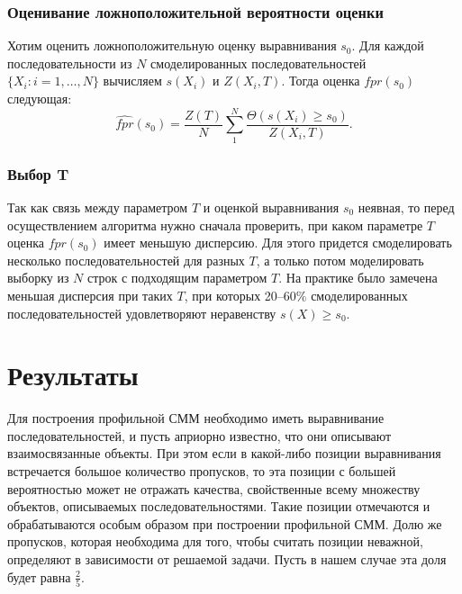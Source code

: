 \documentclass[specialist,
substylefile = spbu_report.rtx,
subf,href,colorlinks=true, 12pt]{disser}
\begin{document}
			\subsection{Оценивание ложноположительной вероятности оценки}			
				Хотим оценить ложноположительную оценку выравнивания $s_{0}$. Для каждой последовательности из $N$ смоделированных последовательностей $\{X_{i}:i=1,\dots,N\}$ вычисляем $s(X_{i})$ и $Z(X_{i}, T)$. Тогда оценка $fpr(s_{0})$ следующая:
				\begin{equation*}	
					\widehat{fpr}(s_{0}) = \frac{Z(T)}{N} \sum_{1}^{N} \frac{\Theta(s(X_{i}) \geq s_{0})}{Z(X_{i}, T)}.
					\label{eq:16}
				\end{equation*}							
			
			\subsection{Выбор T}
				Так как связь между параметром $T$ и оценкой выравнивания $s_{0}$ неявная, то перед осуществлением алгоритма нужно сначала проверить, при каком параметре $T$ оценка $fpr(s_{0})$ имеет меньшую дисперсию. Для этого придется смоделировать несколько последовательностей для разных $T$, а только потом моделировать выборку из $N$ строк с подходящим параметром $T$. На практике было замечена меньшая дисперсия при таких $T$, при которых 20--60$\%$ смоделированных последовательностей удовлетворяют неравенству $s(X) \geq s_{0}$.

		\chapter{Результаты}						
			Для построения профильной СММ необходимо иметь выравнивание последовательностей, и пусть априорно известно, что они описывают взаимосвязанные объекты. При этом если в какой-либо позиции выравнивания встречается большое количество пропусков, то эта позиции с большей вероятностью может не отражать качества, свойственные всему множеству объектов, описываемых последовательностями. Такие позиции отмечаются и обрабатываются особым образом при построении профильной СММ. Долю же пропусков, которая необходима для того, чтобы считать позиции неважной, определяют в зависимости от решаемой задачи. Пусть в нашем случае эта доля будет равна $\frac{2}{5}$.
			
\end{document}
